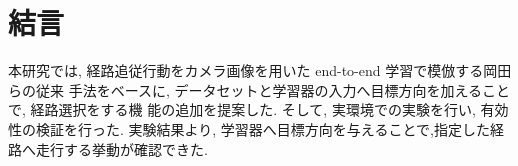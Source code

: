 \documentclass[10pt]{jarticle}
\begin{document}
    
    
    
        
    \section{結\hspace{2zw}言}%
    
    本研究では, 経路追従行動をカメラ画像を用いた end-to-end 学習で模倣する岡田らの従来
手法をベースに, データセットと学習器の入力へ目標方向を加えることで, 経路選択をする機
能の追加を提案した. そして, 
    実環境での実験を行い, 有効性の検証を行った. 実験結果より, 学習器へ目標方向を与えることで,指定した経路へ走行する挙動が確認できた.
    
\end{document}
